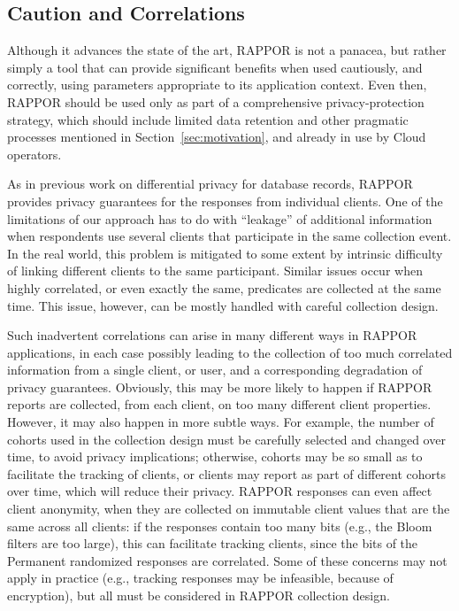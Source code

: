 \documentclass{sig-alternate-2013}
\newcommand\RAPPOR{{RAPPOR}}
\begin{document}
\subsection{Caution and Correlations}
Although it advances the state of the art, 
\RAPPOR{} is not a panacea, but rather simply a tool
that can provide significant benefits
when used cautiously, and correctly, 
using parameters appropriate to its application context.
Even then,
\RAPPOR{} should be used only 
as part of a comprehensive privacy-protection strategy,
which should include
limited data retention and
other pragmatic processes mentioned in Section~\ref{sec:motivation},
and already in use by Cloud operators.

As in previous work on differential privacy for database records, \RAPPOR{} provides privacy guarantees for the responses from individual clients. One of the limitations of our approach has to do with ``leakage'' of additional information when respondents use several clients that participate in the same collection event. In the real world, this problem is mitigated to some extent by intrinsic difficulty of linking different clients to the same participant. Similar issues occur when highly correlated, or even exactly the same, predicates are collected at the same time. This issue, however, can be mostly handled with careful collection design.

Such inadvertent correlations can arise in many different ways in \RAPPOR{} applications, in each case possibly leading to the collection of too much correlated information from a single client, or user, and a corresponding degradation of privacy guarantees.
Obviously, this may be more likely to happen if \RAPPOR{} reports are collected, from each client, on too many different client properties.
However, it may also happen in more subtle ways.
For example, the number of cohorts used in the collection design must be carefully selected and changed over time,
to avoid privacy implications;
otherwise, cohorts may be so small  as to facilitate the tracking of clients,
or clients may report as part of different cohorts over time,
which will reduce their privacy.
\RAPPOR{} responses can even affect client anonymity,
when they are collected on immutable client values that are the same across all clients:
if the responses contain too many bits (e.g., the Bloom filters are too large),
this can facilitate tracking clients,
since the bits of the Permanent randomized responses are correlated.
Some of these concerns may not apply in practice
(e.g., tracking responses may be infeasible, because of encryption),
but all must be considered in \RAPPOR{} collection design.
\end{document}
